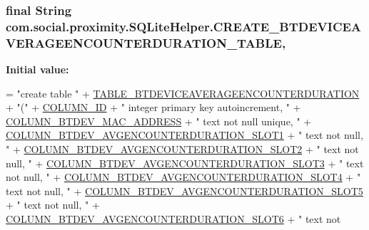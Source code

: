 \subsubsection[{C\+R\+E\+A\+T\+E\+\_\+\+B\+T\+D\+E\+V\+I\+C\+E\+A\+V\+E\+R\+A\+G\+E\+E\+N\+C\+O\+U\+N\+T\+E\+R\+D\+U\+R\+A\+T\+I\+O\+N\+\_\+\+T\+A\+B\+L\+E}]{\setlength{\rightskip}{0pt plus 5cm}final String com.\+social.\+proximity.\+S\+Q\+Lite\+Helper.\+C\+R\+E\+A\+T\+E\+\_\+\+B\+T\+D\+E\+V\+I\+C\+E\+A\+V\+E\+R\+A\+G\+E\+E\+N\+C\+O\+U\+N\+T\+E\+R\+D\+U\+R\+A\+T\+I\+O\+N\+\_\+\+T\+A\+B\+L\+E\hspace{0.3cm}{\ttfamily [static]}, {\ttfamily [private]}}\label{classcom_1_1social_1_1proximity_1_1_s_q_lite_helper_ad6fd653f953e708728c7e84845208638}
{\bfseries Initial value\+:}
\begin{DoxyCode}
= \textcolor{stringliteral}{"create table "}
              + \hyperlink{classcom_1_1social_1_1proximity_1_1_s_q_lite_helper_a7d315c0f15f61c01bac3aba824e6bbce}{TABLE\_BTDEVICEAVERAGEENCOUNTERDURATION} + \textcolor{stringliteral}{"("}
              + \hyperlink{classcom_1_1social_1_1proximity_1_1_s_q_lite_helper_ae0e5a93fedecddb46106b02b939e4601}{COLUMN\_ID} + \textcolor{stringliteral}{" integer primary key autoincrement, "}
              + \hyperlink{classcom_1_1social_1_1proximity_1_1_s_q_lite_helper_a24fb4cdd15815c0527eecadbb7fb5f12}{COLUMN\_BTDEV\_MAC\_ADDRESS} + \textcolor{stringliteral}{" text not null unique, "}
              + \hyperlink{classcom_1_1social_1_1proximity_1_1_s_q_lite_helper_a3b3e9cdce16dfd979199820bb685a105}{COLUMN\_BTDEV\_AVGENCOUNTERDURATION\_SLOT1} + \textcolor{stringliteral}{" text not
       null, "}
              + \hyperlink{classcom_1_1social_1_1proximity_1_1_s_q_lite_helper_a14c609ceff4a243797ac0ed38180c76b}{COLUMN\_BTDEV\_AVGENCOUNTERDURATION\_SLOT2} + \textcolor{stringliteral}{" text not
       null, "}
              + \hyperlink{classcom_1_1social_1_1proximity_1_1_s_q_lite_helper_ac9ee299066e1659d2f00c7ac7b070c01}{COLUMN\_BTDEV\_AVGENCOUNTERDURATION\_SLOT3} + \textcolor{stringliteral}{" text not
       null, "}
              + \hyperlink{classcom_1_1social_1_1proximity_1_1_s_q_lite_helper_a747c8f6e90116d66c055fdbaba96d56e}{COLUMN\_BTDEV\_AVGENCOUNTERDURATION\_SLOT4} + \textcolor{stringliteral}{" text not
       null, "}
              + \hyperlink{classcom_1_1social_1_1proximity_1_1_s_q_lite_helper_a32dd31dc2a2bda82dd9673a33a2e4aac}{COLUMN\_BTDEV\_AVGENCOUNTERDURATION\_SLOT5} + \textcolor{stringliteral}{" text not
       null, "}
              + \hyperlink{classcom_1_1social_1_1proximity_1_1_s_q_lite_helper_a86b01514c7e56288d280557e605f5d7b}{COLUMN\_BTDEV\_AVGENCOUNTERDURATION\_SLOT6} + \textcolor{stringliteral}{" text not
}
\end{DoxyCode}
